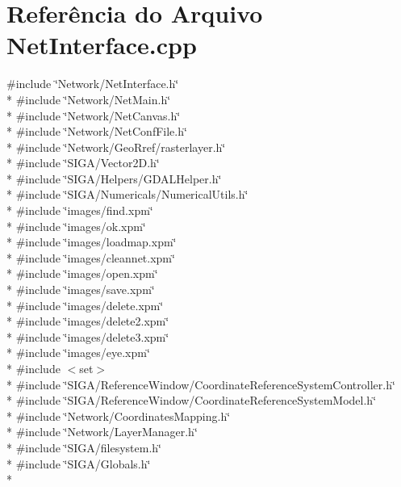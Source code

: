\section{Referência do Arquivo Net\+Interface.\+cpp}
\label{_net_interface_8cpp}
{\ttfamily \#include \char`\"{}Network/\+Net\+Interface.\+h\char`\"{}}\\*
{\ttfamily \#include \char`\"{}Network/\+Net\+Main.\+h\char`\"{}}\\*
{\ttfamily \#include \char`\"{}Network/\+Net\+Canvas.\+h\char`\"{}}\\*
{\ttfamily \#include \char`\"{}Network/\+Net\+Conf\+File.\+h\char`\"{}}\\*
{\ttfamily \#include \char`\"{}Network/\+Geo\+Rref/rasterlayer.\+h\char`\"{}}\\*
{\ttfamily \#include \char`\"{}S\+I\+G\+A/\+Vector2\+D.\+h\char`\"{}}\\*
{\ttfamily \#include \char`\"{}S\+I\+G\+A/\+Helpers/\+G\+D\+A\+L\+Helper.\+h\char`\"{}}\\*
{\ttfamily \#include \char`\"{}S\+I\+G\+A/\+Numericals/\+Numerical\+Utils.\+h\char`\"{}}\\*
{\ttfamily \#include \char`\"{}images/find.\+xpm\char`\"{}}\\*
{\ttfamily \#include \char`\"{}images/ok.\+xpm\char`\"{}}\\*
{\ttfamily \#include \char`\"{}images/loadmap.\+xpm\char`\"{}}\\*
{\ttfamily \#include \char`\"{}images/cleannet.\+xpm\char`\"{}}\\*
{\ttfamily \#include \char`\"{}images/open.\+xpm\char`\"{}}\\*
{\ttfamily \#include \char`\"{}images/save.\+xpm\char`\"{}}\\*
{\ttfamily \#include \char`\"{}images/delete.\+xpm\char`\"{}}\\*
{\ttfamily \#include \char`\"{}images/delete2.\+xpm\char`\"{}}\\*
{\ttfamily \#include \char`\"{}images/delete3.\+xpm\char`\"{}}\\*
{\ttfamily \#include \char`\"{}images/eye.\+xpm\char`\"{}}\\*
{\ttfamily \#include $<$set$>$}\\*
{\ttfamily \#include \char`\"{}S\+I\+G\+A/\+Reference\+Window/\+Coordinate\+Reference\+System\+Controller.\+h\char`\"{}}\\*
{\ttfamily \#include \char`\"{}S\+I\+G\+A/\+Reference\+Window/\+Coordinate\+Reference\+System\+Model.\+h\char`\"{}}\\*
{\ttfamily \#include \char`\"{}Network/\+Coordinates\+Mapping.\+h\char`\"{}}\\*
{\ttfamily \#include \char`\"{}Network/\+Layer\+Manager.\+h\char`\"{}}\\*
{\ttfamily \#include \char`\"{}S\+I\+G\+A/filesystem.\+h\char`\"{}}\\*
{\ttfamily \#include \char`\"{}S\+I\+G\+A/\+Globals.\+h\char`\"{}}\\*
